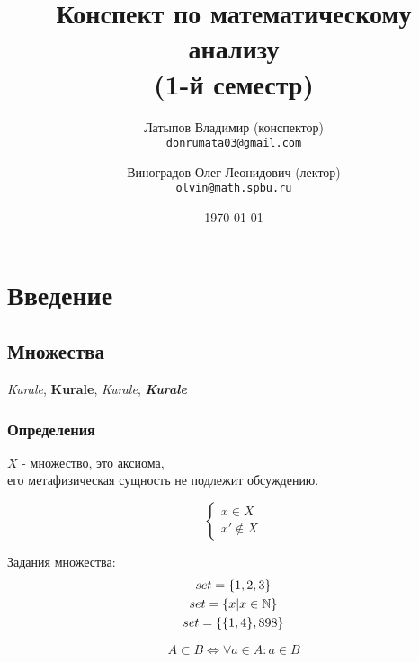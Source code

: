\documentclass[12pt, a4paper]{article}
\title{Конспект по математическому анализу \\(1-й семестр)}
\author{
  Латыпов Владимир (конспектор)\\
  \texttt{donrumata03@gmail.com}
  \and
  Виноградов Олег Леонидович (лектор)\\
  \texttt{olvin@math.spbu.ru}
}
\date{\today}
\begin{document}
     \maketitle
     \newpage
     \tableofcontents
     \newpage
    

    \section{Введение}
    
    \subsection{Множества}
    
    \textit{Kurale}, 
    \textbf{Kurale},
    \textsl{Kurale},
    \textit{\textbf{Kurale}}


    \subsubsection{Определения} 
    
    \begin{definition}[Множество]
      $X$ - множество, это аксиома, \\
      его метафизическая сущность не подлежит обсуждению.  
    \end{definition}
    
    \begin{equation}
      \begin{cases}
        x \in X \\
        x' \notin X
      \end{cases}
    \end{equation}

    \begin{example}
      Задания множества: 
      \begin{gather}
        set = \{1, 2, 3\} \\
        set = \{x | x \in {\mathbb{N}}\} \\
        set = \{\{1, 4\}, 898\}
      \end{gather}
    \end{example}
    
    \begin{definition}[Подмножество]
      \begin{equation}
        A \subset B \Longleftrightarrow \forall a \in A: a \in B
      \end{equation}
    \end{definition}
\end{document}
